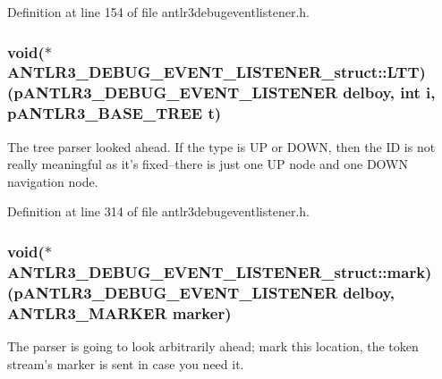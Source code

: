 Definition at line 154 of file antlr3debugeventlistener.\-h.

\hypertarget{struct_a_n_t_l_r3___d_e_b_u_g___e_v_e_n_t___l_i_s_t_e_n_e_r__struct_a357f77b7235cc77e2a5128d62f7121eb}{
\subsubsection[{L\-T\-T}]{\setlength{\rightskip}{0pt plus 5cm}void($\ast$ A\-N\-T\-L\-R3\-\_\-\-D\-E\-B\-U\-G\-\_\-\-E\-V\-E\-N\-T\-\_\-\-L\-I\-S\-T\-E\-N\-E\-R\-\_\-struct\-::\-L\-T\-T)({\bf p\-A\-N\-T\-L\-R3\-\_\-\-D\-E\-B\-U\-G\-\_\-\-E\-V\-E\-N\-T\-\_\-\-L\-I\-S\-T\-E\-N\-E\-R} delboy, int {\bf i}, {\bf p\-A\-N\-T\-L\-R3\-\_\-\-B\-A\-S\-E\-\_\-\-T\-R\-E\-E} {\bf t})}}\label{struct_a_n_t_l_r3___d_e_b_u_g___e_v_e_n_t___l_i_s_t_e_n_e_r__struct_a357f77b7235cc77e2a5128d62f7121eb}
The tree parser looked ahead. If the type is U\-P or D\-O\-W\-N, then the I\-D is not really meaningful as it's fixed--there is just one U\-P node and one D\-O\-W\-N navigation node. 

Definition at line 314 of file antlr3debugeventlistener.\-h.

\hypertarget{struct_a_n_t_l_r3___d_e_b_u_g___e_v_e_n_t___l_i_s_t_e_n_e_r__struct_ac3a29f3c8779cc97c9188f45cdc3d2ec}{
\subsubsection[{mark}]{\setlength{\rightskip}{0pt plus 5cm}void($\ast$ A\-N\-T\-L\-R3\-\_\-\-D\-E\-B\-U\-G\-\_\-\-E\-V\-E\-N\-T\-\_\-\-L\-I\-S\-T\-E\-N\-E\-R\-\_\-struct\-::mark)({\bf p\-A\-N\-T\-L\-R3\-\_\-\-D\-E\-B\-U\-G\-\_\-\-E\-V\-E\-N\-T\-\_\-\-L\-I\-S\-T\-E\-N\-E\-R} delboy, {\bf A\-N\-T\-L\-R3\-\_\-\-M\-A\-R\-K\-E\-R} marker)}}\label{struct_a_n_t_l_r3___d_e_b_u_g___e_v_e_n_t___l_i_s_t_e_n_e_r__struct_ac3a29f3c8779cc97c9188f45cdc3d2ec}
The parser is going to look arbitrarily ahead; mark this location, the token stream's marker is sent in case you need it. 

